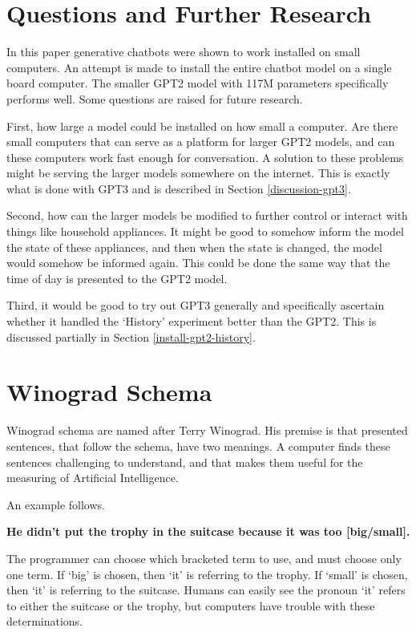 \section{Questions and Further Research}

In this paper generative chatbots were shown to work installed on small computers. An attempt is made to install the entire chatbot model on a single board computer. The smaller GPT2 model with 117M parameters specifically performs well. Some questions are raised for future research.

First, how large a model could be installed on how small a computer. Are there small computers that can serve as a platform for larger GPT2 models, and can these computers work fast enough for conversation. A solution to these problems might be serving the larger models somewhere on the internet. This is exactly what is done with GPT3 and is described in Section \ref{discussion-gpt3}.

Second, how can the larger models be modified to further control or interact with things like household appliances. It might be good to somehow inform the model the state of these appliances, and then when the state is changed, the model would somehow be informed again. This could be done the same way that the time of day is presented to the GPT2 model.

Third, it would be good to try out GPT3 generally and specifically ascertain whether it handled the `History' experiment better than the GPT2. This is discussed partially in Section \ref{install-gpt2-history}. 


\section{Winograd Schema}

Winograd schema are named after Terry Winograd. His premise is that presented sentences, that follow the schema, have two meanings. A computer finds these sentences challenging to understand, and that makes them useful for the measuring of Artificial Intelligence.

An example follows.

\begin{center}
	\textbf{He didn't put the trophy in the suitcase because it was too [big/small].}
\end{center}

The programmer can choose which bracketed term to use, and must choose only one term. If `big' is chosen, then `it' is referring to the trophy. If `small' is chosen, then `it' is referring to the suitcase. Humans can easily see the pronoun `it' refers to either the suitcase or the trophy, but computers have trouble with these determinations.

